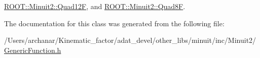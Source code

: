 \mbox{\hyperlink{classROOT_1_1Minuit2_1_1Quad12F_ad68fa5e48b2de950139a1e73a5a0558b}{R\+O\+O\+T\+::\+Minuit2\+::\+Quad12F}}, and \mbox{\hyperlink{classROOT_1_1Minuit2_1_1Quad8F_ade3e6d285a6c3733f9032d6e5c0c0a9b}{R\+O\+O\+T\+::\+Minuit2\+::\+Quad8F}}.



The documentation for this class was generated from the following file\+:\begin{DoxyCompactItemize}
\item 
/\+Users/archanar/\+Kinematic\+\_\+factor/adat\+\_\+devel/other\+\_\+libs/minuit/inc/\+Minuit2/\mbox{\hyperlink{other__libs_2minuit_2inc_2Minuit2_2GenericFunction_8h}{Generic\+Function.\+h}}\end{DoxyCompactItemize}
